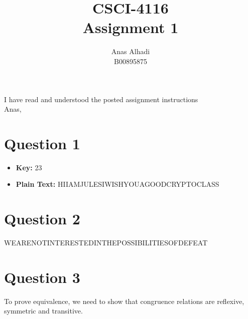 \documentclass{article}
\title{\textbf{CSCI-4116\\Assignment 1}}
\author{Anas Alhadi\\B00895875}
\numberwithin{equation}{subsection}
\begin{document}
	\maketitle

	\vspace{20pt}
	
	\par{
		I have read and understood the posted assignment instructions\\
		Anas,
	}

	\hrulefill

	\vspace{25pt}
	\section*{Question 1}
	
	\begin{itemize}
		\item \textbf{Key: } 23
		\item \textbf{Plain Text: } HIIAMJULESIWISHYOUAGOODCRYPTOCLASS
	\end{itemize}

	\vspace{25pt}
	\section*{Question 2}
		WEARENOTINTERESTEDINTHEPOSSIBILITIESOFDEFEAT

	\vspace{25pt}
	\section*{Question 3}
	To prove equivalence, we need to show that congruence relations are reflexive,
	symmetric and transitive.
\end{document}
